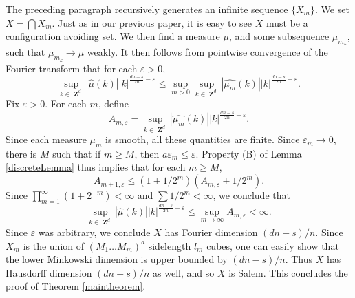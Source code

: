 \documentclass[12pt,reqno]{article}
\numberwithin{equation}{section}
\DeclareMathOperator{\ZZ}{\mathbf{Z}}
\DeclareMathOperator{\DQ}{\mathcal{Q}}
\begin{document}
The preceding paragraph recursively generates an infinite sequence $\{ X_m \}$. We set $X = \bigcap X_m$. Just as in our previous paper, it is easy to see $X$ must be a configuration avoiding set. We then find a measure $\mu$, and some subsequence $\mu_{m_k}$, such that $\mu_{m_k} \to \mu$ weakly. It then follows from pointwise convergence of the Fourier transform that for each $\varepsilon > 0$,
%
\[ \sup_{k \in \ZZ^d} |\widehat{\mu}(k)| |k|^{\frac{dn-s}{2n} - \varepsilon} \leq \sup_{m  > 0} \sup_{k \in \ZZ^d} |\widehat{\mu_m}(k)| |k|^{\frac{dn - s}{2n} - \varepsilon}. \]
%
Fix $\varepsilon > 0$. For each $m$, define
%
\[ A_{m,\varepsilon} = \sup_{k \in \ZZ^d} |\widehat{\mu_m}(k)| |k|^{\frac{dn-s}{2n} - \varepsilon}. \]
%
Since each measure $\mu_m$ is smooth, all these quantities are finite. Since $\varepsilon_m \to 0$, there is $M$ such that if $m \geq M$, then $a \varepsilon_m \leq \varepsilon$. Property (B) of Lemma \eqref{discreteLemma} thus implies that for each $m \geq M$,
%
\[ A_{m+1,\varepsilon} \leq (1 + 1/2^m)(A_{m,\varepsilon} + 1/2^m). \]
%
Since $\prod_{m = 1}^\infty (1 + 2^{-m}) < \infty$ and $\sum 1/2^m < \infty$, we conclude that
%
\[ \sup_{k \in \ZZ^d} |\widehat{\mu}(k)| |k|^{\frac{dn-s}{2n} - \varepsilon} \leq \sup_{m \to \infty} A_{m,\varepsilon} < \infty. \]
%
Since $\varepsilon$ was arbitrary, we conclude $X$ has Fourier dimension $(dn - s) / n$. Since $X_m$ is the union of $(M_1 \dots M_m)^d$ sidelength $l_m$ cubes, one can easily show that the lower Minkowski dimension is upper bounded by $(dn - s)/n$. Thus $X$ has Hausdorff dimension $(dn - s)/n$ as well, and so $X$ is Salem. This concludes the proof of Theorem \ref{maintheorem}.

\begin{comment}
It is easy to see from our proof that for each $m$,
%
\[ \#(\DQ_m(X_m)) = \frac{1}{(M_1 \dots M_m)^d}. \]
%
Thus
%
\begin{align*}
    \log_{1/l_m}(\#(\DQ_m(X_m))) &= \frac{d \log(M_1 \dots M_m)}{\log(N_1 \dots N_m)}\\
    &\sim \frac{d \log(M_m)}{\log(N_m)}\\
    &= \frac{d \log(M_m)}{\log(M_m) + \log(K_m)}\\
    &= \frac{d}{1 + \log_{M_m}(K_m)}\\
    &\sim \frac{d}{1 + \left(\frac{s}{dn - s} + c\varepsilon \right)}\\
    &= \frac{d}{\frac{dn}{dn - s} + c\varepsilon_m}.
\end{align*}
%
Thus
%
\[ \lim_{m \to \infty} \log_{1/l_m}(\#(\DQ_m(X_m))) \leq \frac{dn - s}{n}. \]
%
In particular, this means $X$ has lower Minkowski dimension at most $(dn - s)/n$, which, together with the Fourier dimension bound, implies that $X$ is Salem.
\end{comment}
\end{document}
